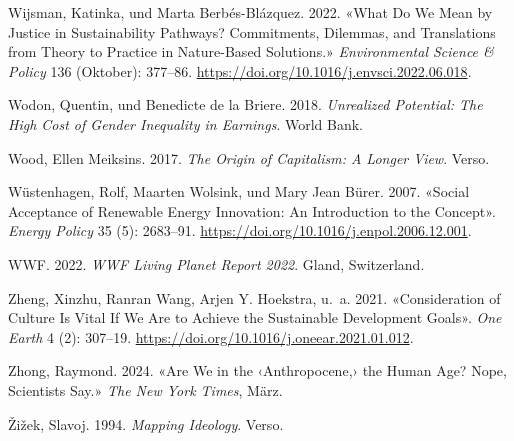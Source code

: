\documentclass[
  nswissgerman,
  a4paper,
  openany]{book}
\newlength{\cslhangindent}
\newenvironment{CSLReferences}[2] %
 {\begin{list}{}{%
  \setlength{\itemindent}{0pt}
  \setlength{\leftmargin}{0pt}
  \setlength{\parsep}{0pt}
  \ifodd #1
   \setlength{\leftmargin}{\cslhangindent}
   \setlength{\itemindent}{-1\cslhangindent}
  \fi
  \setlength{\itemsep}{#2\baselineskip}}}
 {\end{list}}
\begin{document}
\begin{CSLReferences}{1}{1}
Wijsman, Katinka, und Marta Berbés-Blázquez. 2022. {«What Do We Mean by
Justice in Sustainability Pathways? {Commitments}, Dilemmas, and
Translations from Theory to Practice in Nature-Based Solutions.»}
\emph{Environmental Science \& Policy} 136 (Oktober): 377--86.
\url{https://doi.org/10.1016/j.envsci.2022.06.018}.

{Wodon, Quentin, und Benedicte de la Briere}. 2018. \emph{Unrealized
Potential: {The} High Cost of Gender Inequality in Earnings}. World
Bank.

Wood, Ellen Meiksins. 2017. \emph{The Origin of Capitalism: A Longer
View}. Verso.

Wüstenhagen, Rolf, Maarten Wolsink, und Mary Jean Bürer. 2007. {«Social
Acceptance of Renewable Energy Innovation: {An} Introduction to the
Concept»}. \emph{Energy Policy} 35 (5): 2683--91.
\url{https://doi.org/10.1016/j.enpol.2006.12.001}.

WWF. 2022. \emph{{WWF Living Planet Report} 2022}. Gland, Switzerland.

Zheng, Xinzhu, Ranran Wang, Arjen Y. Hoekstra, u.~a. 2021.
{«Consideration of Culture Is Vital If We Are to Achieve the
{Sustainable Development Goals}»}. \emph{One Earth} 4 (2): 307--19.
\url{https://doi.org/10.1016/j.oneear.2021.01.012}.

Zhong, Raymond. 2024. {«Are {We} in the {‹{Anthropocene},›} the {Human
Age}? {Nope}, {Scientists Say}.»} \emph{The New York Times}, März.

Žižek, Slavoj. 1994. \emph{Mapping {Ideology}}. Verso.

\end{CSLReferences}


\backmatter
\end{document}
